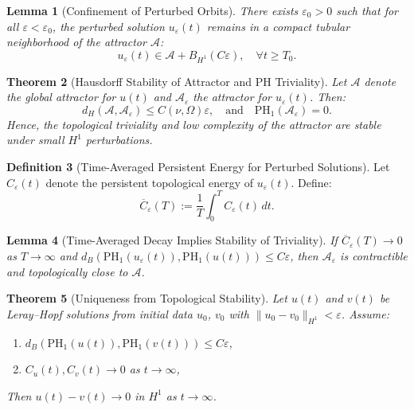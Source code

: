 \documentclass[11pt]{article}
\newtheorem{theorem}{Theorem}[section]
\newtheorem{lemma}[theorem]{Lemma}
\theoremstyle{definition}
\newtheorem{definition}[theorem]{Definition}
\begin{document}
\begin{lemma}[Confinement of Perturbed Orbits]
There exists $\varepsilon_0 > 0$ such that for all $\varepsilon < \varepsilon_0$, the perturbed solution $u_\varepsilon(t)$ remains in a compact tubular neighborhood of the attractor $\mathcal{A}$:
\[
u_\varepsilon(t) \in \mathcal{A} + B_{H^1}(C\varepsilon), \quad \forall t \ge T_0.
\]
\end{lemma}

\begin{theorem}[Hausdorff Stability of Attractor and PH Triviality]
\label{thm:attractor_stability}
Let $\mathcal{A}$ denote the global attractor for $u(t)$ and $\mathcal{A}_\varepsilon$ the attractor for $u_\varepsilon(t)$. Then:
\[
d_H(\mathcal{A}, \mathcal{A}_\varepsilon) \le C(\nu, \Omega)\varepsilon, \quad \text{and} \quad \mathrm{PH}_1(\mathcal{A}_\varepsilon) = 0.
\]
Hence, the topological triviality and low complexity of the attractor are stable under small $H^1$ perturbations.
\end{theorem}

\begin{definition}[Time-Averaged Persistent Energy for Perturbed Solutions]
Let $C_\varepsilon(t)$ denote the persistent topological energy of $u_\varepsilon(t)$. Define:
\[
\overline{C}_\varepsilon(T) := \frac{1}{T} \int_0^T C_\varepsilon(t)\, dt.
\]
\end{definition}

\begin{lemma}[Time-Averaged Decay Implies Stability of Triviality]
If $\overline{C}_\varepsilon(T) \to 0$ as $T \to \infty$ and $d_B(\mathrm{PH}_1(u_\varepsilon(t)), \mathrm{PH}_1(u(t))) \le C \varepsilon$, then $\mathcal{A}_\varepsilon$ is contractible and topologically close to $\mathcal{A}$.
\end{lemma}

\begin{theorem}[Uniqueness from Topological Stability]
Let $u(t)$ and $v(t)$ be Leray--Hopf solutions from initial data $u_0$, $v_0$ with $\|u_0 - v_0\|_{H^1} < \varepsilon$. Assume:
\begin{enumerate}
  \item $d_B(\mathrm{PH}_1(u(t)), \mathrm{PH}_1(v(t))) \leq C\varepsilon$,
  \item $C_u(t), C_v(t) \to 0$ as $t \to \infty$,
\end{enumerate}
Then $u(t) - v(t) \to 0$ in $H^1$ as $t \to \infty$.
\end{theorem}
\end{document}
